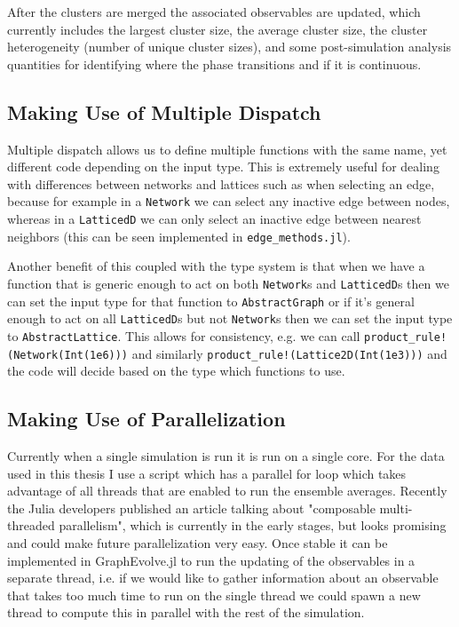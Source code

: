 After the clusters are merged the associated observables are updated, which currently includes the largest cluster size, the average cluster size, the cluster heterogeneity (number of unique cluster sizes), and some post-simulation analysis quantities for identifying where the phase transitions and if it is continuous.



\subsection{Making Use of Multiple Dispatch}
Multiple dispatch allows us to define multiple functions with the same name, yet different code depending on the input type.
This is extremely useful for dealing with differences between networks and lattices such as when selecting an edge, because for example in a \texttt{Network} we can select any inactive edge between nodes, whereas in a \texttt{LatticedD} we can only select an inactive edge between nearest neighbors (this can be seen implemented in \texttt{edge\_methods.jl}).

Another benefit of this coupled with the type system is that when we have a function that is generic enough to act on both \texttt{Network}s and \texttt{LatticedD}s then we can set the input type for that function to \texttt{AbstractGraph} or if it's general enough to act on all \texttt{LatticedD}s but not \texttt{Network}s then we can set the input type to \texttt{AbstractLattice}.
This allows for consistency, e.g. we can call \texttt{product\_rule!(Network(Int(1e6)))} and similarly \texttt{product\_rule!(Lattice2D(Int(1e3)))} and the code will decide based on the type which functions to use.



\subsection{Making Use of Parallelization}
Currently when a single simulation is run it is run on a single core.
For the data used in this thesis I use a script which has a parallel for loop which takes advantage of all threads that are enabled to run the ensemble averages.
Recently the Julia developers published an article talking about "composable multi-threaded parallelism", which is currently in the early stages, but looks promising and could make future parallelization very easy.
Once stable it can be implemented in GraphEvolve.jl to run the updating of the observables in a separate thread, i.e. if we would like to gather information about an observable that takes too much time to run on the single thread we could spawn a new thread to compute this in parallel with the rest of the simulation.



